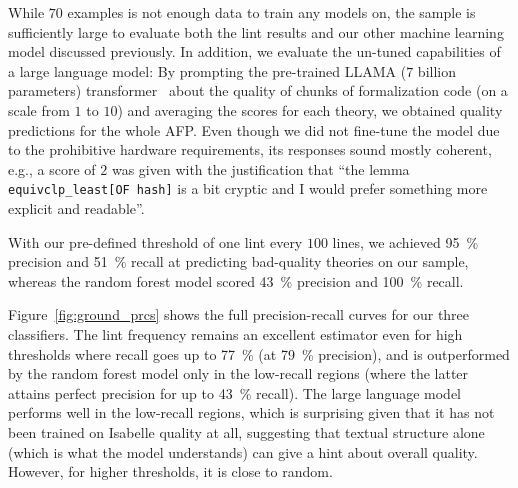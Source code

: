 While $70$ examples is not enough data to train any models on,
the sample is sufficiently large to evaluate both the lint results and our other machine learning model discussed previously.
In addition,
we evaluate the un-tuned capabilities of a large language model:
By prompting the pre-trained LLAMA ($7$ billion parameters) transformer~\cite{touvron2023llama}
about the quality of chunks of formalization code
(on a scale from $1$ to $10$)
and averaging the scores for each theory,
we obtained quality predictions for the whole AFP\@.
Even though we did not fine-tune the model due to the prohibitive hardware requirements,
its responses sound mostly coherent, e.g., a score of $2$ was given with the justification that \enquote{the lemma \texttt{equivclp\_least[OF hash]} is a bit cryptic and I would prefer something more explicit and readable}.

With our pre-defined threshold of one lint every $100$ lines,
we achieved \SI{95}{\percent} precision and \SI{51}{\percent} recall
at predicting bad-quality theories on our sample,
whereas the random forest model scored \SI{43}{\percent} precision and \SI{100}{\percent} recall.

Figure~\ref{fig:ground_prcs} shows the full precision-recall curves for our three classifiers.
The lint frequency remains an excellent estimator even for high thresholds where recall goes up to \SI{77}{\percent} (at \SI{79}{\percent} precision),
and is outperformed by the random forest model only in the low-recall regions
(where the latter attains perfect precision for up to \SI{43}{\percent} recall).
The large language model performs well in the low-recall regions,
which is surprising given that it has not been trained on Isabelle quality at all,
suggesting that textual structure alone
(which is what the model understands)
can give a hint about overall quality.
However, for higher thresholds,
it is close to random.
